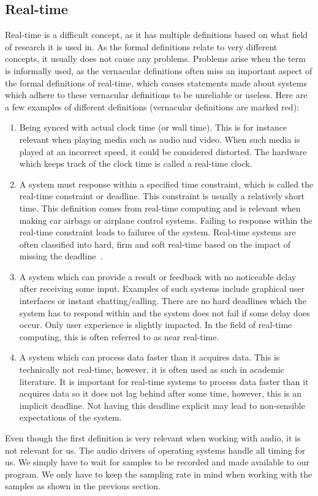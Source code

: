 \documentclass[10pt,twocolumn]{article}
\begin{document}
\subsection{Real-time}
Real-time is a difficult concept, as it has multiple definitions based on what field of research it is used in. As the formal definitions relate to very different concepts, it usually does not cause any problems. Problems arise when the term is informally used, as the vernacular definitions often miss an important aspect of the formal definitions of real-time, which causes statements made about systems which adhere to these vernacular definitions to be unreliable or useless. Here are a few examples of different definitions (vernacular definitions are marked red):
\begin{enumerate}
    \item Being synced with actual clock time (or wall time). This is for instance relevant when playing media such as audio and video. When such media is played at an incorrect speed, it could be considered distorted. The hardware which keeps track of the clock time is called a real-time clock.
    \item A system must response within a specified time constraint, which is called the real-time constraint or deadline. This constraint is usually a relatively short time. This definition comes from real-time computing and is relevant when making car airbags or airplane control systems. Failing to response within the real-time constraint leads to failures of the system. Real-time systems are often classified into hard, firm and soft real-time based on the impact of missing the deadline~\cite{realclass}. 
    \color{red}\item\color{black} A system which can provide a result or feedback with no noticeable delay after receiving some input. Examples of such systems include graphical user interfaces or instant chatting/calling. There are no hard deadlines which the system has to respond within and the system does not fail if some delay does occur. Only user experience is slightly impacted. In the field of real-time computing, this is often referred to as near real-time.
    \color{red}\item\color{black} A system which can process data faster than it acquires data. This is technically not real-time, however, it is often used as such in academic literature. It is important for real-time systems to process data faster than it acquires data so it does not lag behind after some time, however, this is an implicit deadline. Not having this deadline explicit may lead to non-sensible expectations of the system.
\end{enumerate}
Even though the first definition is very relevant when working with audio, it is not relevant for us. The audio drivers of operating systems handle all timing for us. We simply have to wait for samples to be recorded and made available to our program. We only have to keep the sampling rate in mind when working with the samples as shown in the previous section.
\end{document}

